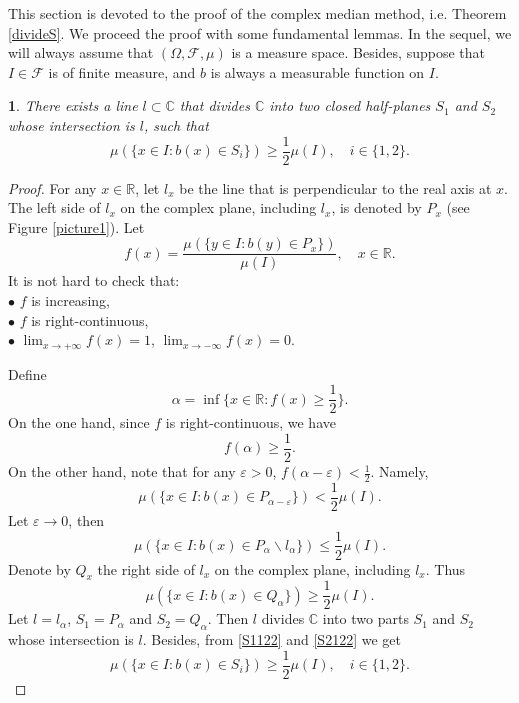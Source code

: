 \documentclass[oneside,english,a4wide]{amsart}
\numberwithin{equation}{section}
\numberwithin{figure}{section}
\theoremstyle{plain}
\theoremstyle{plain}
\theoremstyle{definition}
\theoremstyle{plain}
\newtheorem{lem}[thm]{\protect\lemmaname}
\theoremstyle{remark}
\theoremstyle{definition}
\theoremstyle{remark}
\theoremstyle{definition}
\providecommand{\lemmaname}{Lemma}
\newcommand{\8}{\infty}
\begin{document}
This section is devoted to the proof of the complex median method, i.e. Theorem \ref{divideS}. We proceed the proof with some fundamental lemmas. In the sequel, we will always assume that $(\Omega,\mathcal{F},\mu)$ is a measure space. Besides, suppose that $I\in \mathcal{F}$ is of finite measure, and $b$ is always a measurable function on $I$.
\begin{lem}\label{S1S2S}
	There exists a line $l\subset \mathbb{C}$ that divides $\mathbb{C}$ into two closed half-planes $S_1$ and $S_2$ whose intersection is $l$, such that 
	\begin{equation*}
		\mu(\{x\in I:b(x)\in S_i\})\ge \frac{1}{2}\mu(I),\quad i\in\{1, 2\}.
	\end{equation*}
\end{lem}

\begin{proof}
	For any $x\in \mathbb{R}$, let $l_x$ be the line that is perpendicular to the real axis at $x$. The left side of $l_x$ on the complex plane, including $l_x$, is denoted by $P_x$ (see Figure \ref{picture1}). Let 
	\begin{equation*}
		f(x)=\frac{\mu(\{y\in I:b(y)\in P_x\})}{\mu(I)}, \quad x\in \mathbb{R}.
	\end{equation*}
	It is not hard to check that:\\
    $\bullet$ $f$ is increasing,\\
    $\bullet$ $f$ is right-continuous,\\
	$\bullet$ $\lim_{x\to +\infty}f(x)=1$, $\lim_{x\to -\infty}f(x)=0$.

	Define 
	\begin{equation*}
		\alpha=\inf \Big\{x\in \mathbb{R}: f(x)\ge \frac{1}{2}\Big\}.
	\end{equation*}
	On the one hand, since $f$ is right-continuous, we have 
	\begin{equation}\label{S1122}
		f(\alpha)\ge \frac{1}{2}.
	\end{equation}
	On the other hand, note that for any $\varepsilon>0$, $f(\alpha-\varepsilon)<\frac{1}{2}$. Namely, 
	\begin{equation*}
		\mu(\{x\in I:b(x)\in P_{\alpha-\varepsilon}\})<\frac{1}{2}\mu(I).
	\end{equation*}
	Let $\varepsilon\to 0$, then
	\begin{equation*}
		\mu(\{x\in I:b(x)\in P_{\alpha} \backslash l_{\alpha}\})\le \frac{1}{2}\mu(I).
	\end{equation*}
	Denote by $Q_x$ the right side of $l_x$ on the complex plane, including $l_x$. Thus
	\begin{equation}\label{S2122}
		\mu(\{x\in I:b(x)\in Q_{\alpha}\})\ge \frac{1}{2}\mu(I).
	\end{equation}
	Let $l=l_{\alpha}$, $S_1=P_{\alpha}$ and $S_2=Q_{\alpha}$. Then $l$ divides $\mathbb{C}$ into two parts $S_1$ and $S_2$ whose intersection is $l$. Besides, from \eqref{S1122} and \eqref{S2122} we get
	\begin{equation*}
		\mu(\{x\in I:b(x)\in S_i\})\ge \frac{1}{2}\mu(I),\quad i\in\{1, 2\}.
	\end{equation*}	
\end{proof}
\end{document}

